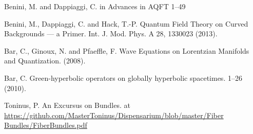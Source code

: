 \documentclass[a4paper,12pt]{scrartcl}    %
\begin{document}
		
\begin{thebibliography}{100}

 Benini, M. and Dappiaggi, C. in Advances in AQFT 1–49

 Benini, M., Dappiaggi, C. and Hack, T.-P. Quantum Field Theory on Curved Backgrounds — a Primer. Int. J. Mod. Phys. A 28, 1330023 (2013).

 Bar, C., Ginoux, N. and Pfaeffle, F. Wave Equations on Lorentzian Manifolds and Quantization. (2008).

  Bar, C. Green-hyperbolic operators on globally hyperbolic spacetimes. 1–26 (2010).


  Toninus, P. An Excursus on Bundles. at \url{https://github.com/MasterToninus/Dispensarium/blob/master/Fiber Bundles/FiberBundles.pdf}

\end{thebibliography}		
\end{document}
